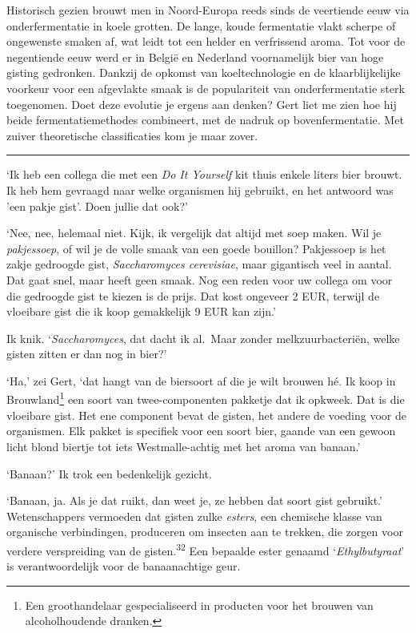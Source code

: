 \documentclass[
  11pt,
  dutch,
]{memoir}
\begin{document}
Historisch gezien brouwt men in Noord-Europa reeds sinds de veertiende
eeuw via onderfermentatie in koele grotten. De lange, koude fermentatie
vlakt scherpe of ongewenste smaken af, wat leidt tot een helder en
verfrissend aroma. Tot voor de negentiende eeuw werd er in België en
Nederland voornamelijk bier van hoge gisting gedronken. Dankzij de
opkomst van koeltechnologie en de klaarblijkelijke voorkeur voor een
afgevlakte smaak is de populariteit van onderfermentatie sterk
toegenomen. Doet deze evolutie je ergens aan denken? Gert liet me zien
hoe hij beide fermentatiemethodes combineert, met de nadruk op
bovenfermentatie. Met zuiver theoretische classificaties kom je maar
zover.

\pfbreak

`Ik heb een collega die met een \emph{Do It Yourself} kit thuis enkele
liters bier brouwt. Ik heb hem gevraagd naar welke organismen hij
gebruikt, en het antwoord was 'een pakje gist'. Doen jullie dat ook?'

`Nee, nee, helemaal niet. Kijk, ik vergelijk dat altijd met soep maken.
Wil je \emph{pakjessoep}, of wil je de volle smaak van een goede
bouillon? Pakjessoep is het zakje gedroogde gist, \emph{Saccharomyces
cerevisiae}, maar gigantisch veel in aantal. Dat gaat snel, maar heeft
geen smaak. Nog een reden voor uw collega om voor die gedroogde gist te
kiezen is de prijs. Dat kost ongeveer 2 EUR, terwijl de vloeibare gist
die ik koop gemakkelijk 9 EUR kan zijn.'

Ik knik. `\emph{Saccharomyces}, dat dacht ik al.~Maar zonder
melkzuurbacteriën, welke gisten zitten er dan nog in bier?'

`Ha,' zei Gert, `dat hangt van de biersoort af die je wilt brouwen hé.
Ik koop in Brouwland\footnote{Een groothandelaar gespecialiseerd in
  producten voor het brouwen van alcoholhoudende dranken.} een soort van
twee-componenten pakketje dat ik opkweek. Dat is die vloeibare gist. Het
ene component bevat de gisten, het andere de voeding voor de organismen.
Elk pakket is specifiek voor een soort bier, gaande van een gewoon licht
blond biertje tot iets Westmalle-achtig met het aroma van banaan.'

`Banaan?' Ik trok een bedenkelijk gezicht.

`Banaan, ja. Als je dat ruikt, dan weet je, ze hebben dat soort gist
gebruikt.' Wetenschappers vermoeden dat gisten zulke \emph{esters}, een
chemische klasse van organische verbindingen, produceren om insecten aan
te trekken, die zorgen voor verdere verspreiding van de
gisten.\textsuperscript{32} Een bepaalde ester genaamd
`\emph{Ethylbutyraat}' is verantwoordelijk voor de banaanachtige geur.
\end{document}
